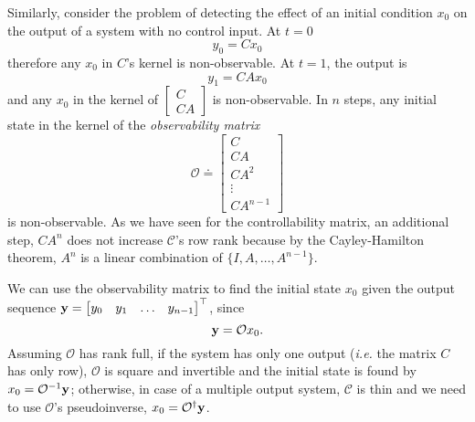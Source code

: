 Similarly, consider the problem of detecting the effect of an initial condition $x_0$ on the output of a system with no control input. At $t=0$
\begin{equation*}
  y_0 = Cx_0
\end{equation*}
therefore any $x_0$ in $C$'s kernel is non-observable. At $t=1$, the output is
\begin{equation*}
  y_1 = CAx_0
\end{equation*}
and any $x_0$ in the kernel of $\begin{bmatrix} C \\ CA \end{bmatrix}$ is non-observable. In $n$ steps, any initial state in the kernel of the \emph{observability matrix}
\begin{equation}
  \label{eq:observability-matrix}
  \mathcal{O} \doteq
  \begin{bmatrix}
    C \\ CA \\ CA^2 \\ \vdots \\ CA^{n-1}
  \end{bmatrix}
\end{equation}
is non-observable. As we have seen for the controllability matrix, an additional step, $CA^n$ does not increase $\mathcal{C}$'s row rank because by the Cayley-Hamilton theorem, $A^n$ is a linear combination of $\{I, A,\ldots, A^{n-1}\}$.

We can use the observability matrix to find the initial state $x_0$ given the output sequence $\boldsymbol{\mathrm{y}} = \begin{bmatrix}
    y_0 & y_1 & \ldots & y_{n-1}
  \end{bmatrix}^\top$, since
\begin{equation*}
  \boldsymbol{\mathrm{y}} = \mathcal{O}x_0.
\end{equation*}
Assuming $\mathcal{O}$ has rank full, if the system has only one output (\textit{i.e.} the matrix $C$ has only row), $\mathcal{O}$ is square and invertible and the initial state is found by $x_0 = \mathcal{O}^{-1}\boldsymbol{\mathrm{y}}$; otherwise, in case of a multiple output system, $\mathcal{C}$ is thin and we need to use $\mathcal{O}$'s pseudoinverse, $x_0=\mathcal{O}^\dagger\boldsymbol{\mathrm{y}}$.

